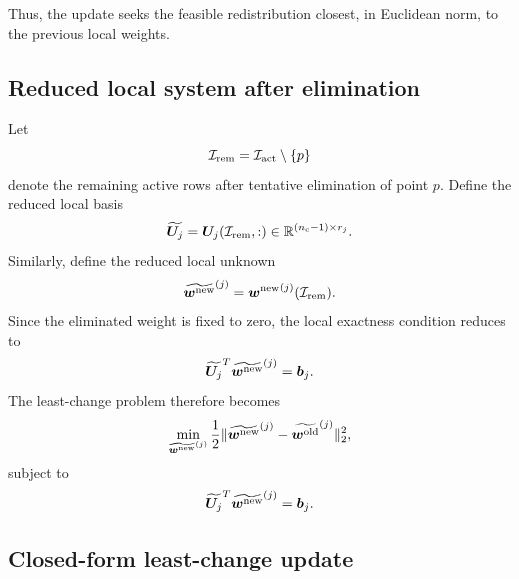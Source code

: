 \documentclass[11pt,a4paper]{article}
\begin{document}
Thus, the update seeks the feasible redistribution closest, in Euclidean norm,
to the previous local weights.

\subsection{Reduced local system after elimination}

Let
\[
        \mathcal{I}_{\mathrm{rem}}
        =
        \mathcal{I}_{\mathrm{act}}\setminus\{p\}
\]
denote the remaining active rows after tentative elimination of point $p$.
Define the reduced local basis
\[
        \widetilde{\bm U_j}
        =
        \bm U_j(\mathcal{I}_{\mathrm{rem}},:)
        \in\mathbb{R}^{(n_{\mathrm{c}}-1)\times r_j}.
\]
Similarly, define the reduced local unknown
\[
        \widetilde{\bm w^{\mathrm{new}}}^{(j)}
        =
        {\bm w^{\mathrm{new}}}^{(j)}(\mathcal{I}_{\mathrm{rem}}).
\]
Since the eliminated weight is fixed to zero, the local exactness condition
reduces to
\[
        \widetilde{\bm U_j}^T
        \widetilde{\bm w^{\mathrm{new}}}^{(j)}
        =
        \bm b_j.
        \label{eq:reduced_exactness_system}
\]
The least-change problem therefore becomes
\[
        \min_{\widetilde{\bm w^{\mathrm{new}}}^{(j)}}
        \frac{1}{2}
        \|
        \widetilde{\bm w^{\mathrm{new}}}^{(j)}
        -
        \widetilde{\bm w^{\mathrm{old}}}^{(j)}
        \|_2^2,
\]
subject to
\[
        \widetilde{\bm U_j}^T
        \widetilde{\bm w^{\mathrm{new}}}^{(j)}
        =
        \bm b_j.
        \label{eq:reduced_least_change_problem}
\]

\subsection{Closed-form least-change update}
\end{document}

